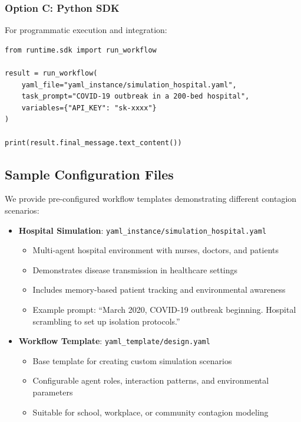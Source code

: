 \subsubsection{Option C: Python SDK}

For programmatic execution and integration:
\begin{verbatim}
from runtime.sdk import run_workflow

result = run_workflow(
    yaml_file="yaml_instance/simulation_hospital.yaml",
    task_prompt="COVID-19 outbreak in a 200-bed hospital",
    variables={"API_KEY": "sk-xxxx"}
)

print(result.final_message.text_content())
\end{verbatim}

\subsection{Sample Configuration Files}

We provide pre-configured workflow templates demonstrating different contagion scenarios:

\begin{itemize}
    \item \textbf{Hospital Simulation}: \texttt{yaml\_instance/simulation\_hospital.yaml}
    \begin{itemize}
        \item Multi-agent hospital environment with nurses, doctors, and patients
        \item Demonstrates disease transmission in healthcare settings
        \item Includes memory-based patient tracking and environmental awareness
        \item Example prompt: ``March 2020, COVID-19 outbreak beginning. Hospital scrambling to set up isolation protocols.''
    \end{itemize}
    
    \item \textbf{Workflow Template}: \texttt{yaml\_template/design.yaml}
    \begin{itemize}
        \item Base template for creating custom simulation scenarios
        \item Configurable agent roles, interaction patterns, and environmental parameters
        \item Suitable for school, workplace, or community contagion modeling
    \end{itemize}
\end{itemize}

